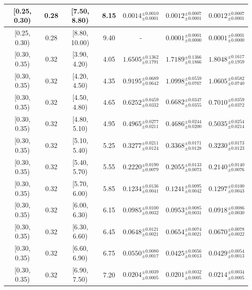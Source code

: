 \begin{longtable}{|c|c|c|c|c|c|c|}
\hline
[0.25, 0.30) & 0.28 & [7.50, 8.80) & 8.15 & $0.0014^{ \pm 0.0010 }_{ \pm 0.0001 }$ & $0.0012^{ \pm 0.0007 }_{ \pm 0.0001 }$ & $0.0012^{ \pm 0.0007 }_{ \pm 0.0001 }$ \\ 
\hline
[0.25, 0.30) & 0.28 & [8.80, 10.00) & 9.40 & - & $0.0001^{ \pm 0.0001 }_{ \pm 0.0000 }$ & $0.0001^{ \pm 0.0001 }_{ \pm 0.0000 }$ \\ 
\hline
[0.30, 0.35) & 0.32 & [3.90, 4.20) & 4.05 & $1.6505^{ \pm 0.1362 }_{ \pm 0.1791 }$ & $1.7189^{ \pm 0.1366 }_{ \pm 0.1866 }$ & $1.8048^{ \pm 0.1617 }_{ \pm 0.1959 }$ \\ 
\hline
[0.30, 0.35) & 0.32 & [4.20, 4.50) & 4.35 & $0.9195^{ \pm 0.0689 }_{ \pm 0.0642 }$ & $1.0998^{ \pm 0.0559 }_{ \pm 0.0767 }$ & $1.0605^{ \pm 0.0582 }_{ \pm 0.0740 }$ \\ 
\hline
[0.30, 0.35) & 0.32 & [4.50, 4.80) & 4.65 & $0.6252^{ \pm 0.0459 }_{ \pm 0.0332 }$ & $0.6682^{ \pm 0.0347 }_{ \pm 0.0355 }$ & $0.7010^{ \pm 0.0359 }_{ \pm 0.0372 }$ \\ 
\hline
[0.30, 0.35) & 0.32 & [4.80, 5.10) & 4.95 & $0.4965^{ \pm 0.0277 }_{ \pm 0.0211 }$ & $0.4686^{ \pm 0.0244 }_{ \pm 0.0200 }$ & $0.5035^{ \pm 0.0254 }_{ \pm 0.0214 }$ \\ 
\hline
[0.30, 0.35) & 0.32 & [5.10, 5.40) & 5.25 & $0.3277^{ \pm 0.0211 }_{ \pm 0.0124 }$ & $0.3368^{ \pm 0.0171 }_{ \pm 0.0128 }$ & $0.3230^{ \pm 0.0173 }_{ \pm 0.0123 }$ \\ 
\hline
[0.30, 0.35) & 0.32 & [5.40, 5.70) & 5.55 & $0.2220^{ \pm 0.0190 }_{ \pm 0.0079 }$ & $0.2055^{ \pm 0.0133 }_{ \pm 0.0073 }$ & $0.2140^{ \pm 0.0140 }_{ \pm 0.0076 }$ \\ 
\hline
[0.30, 0.35) & 0.32 & [5.70, 6.00) & 5.85 & $0.1234^{ \pm 0.0136 }_{ \pm 0.0041 }$ & $0.1241^{ \pm 0.0095 }_{ \pm 0.0042 }$ & $0.1297^{ \pm 0.0100 }_{ \pm 0.0043 }$ \\ 
\hline
[0.30, 0.35) & 0.32 & [6.00, 6.30) & 6.15 & $0.0985^{ \pm 0.0100 }_{ \pm 0.0032 }$ & $0.0953^{ \pm 0.0085 }_{ \pm 0.0031 }$ & $0.0918^{ \pm 0.0086 }_{ \pm 0.0030 }$ \\ 
\hline
[0.30, 0.35) & 0.32 & [6.30, 6.60) & 6.45 & $0.0648^{ \pm 0.0121 }_{ \pm 0.0021 }$ & $0.0654^{ \pm 0.0074 }_{ \pm 0.0021 }$ & $0.0670^{ \pm 0.0078 }_{ \pm 0.0022 }$ \\ 
\hline
[0.30, 0.35) & 0.32 & [6.60, 6.90) & 6.75 & $0.0550^{ \pm 0.0080 }_{ \pm 0.0017 }$ & $0.0425^{ \pm 0.0056 }_{ \pm 0.0013 }$ & $0.0429^{ \pm 0.0054 }_{ \pm 0.0013 }$ \\ 
\hline
[0.30, 0.35) & 0.32 & [6.90, 7.50) & 7.20 & $0.0204^{ \pm 0.0039 }_{ \pm 0.0005 }$ & $0.0201^{ \pm 0.0032 }_{ \pm 0.0005 }$ & $0.0214^{ \pm 0.0034 }_{ \pm 0.0005 }$ \\ 

\end{longtable}
